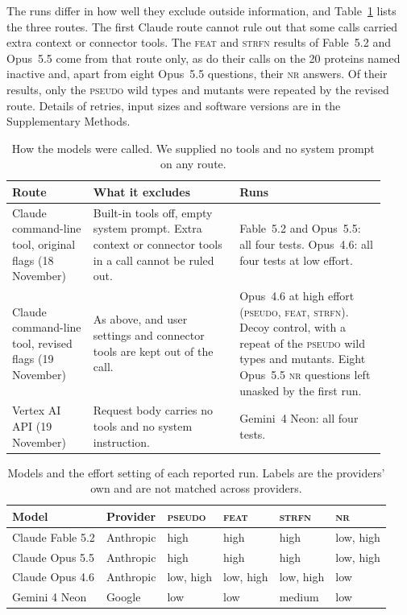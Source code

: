 \documentclass[11pt]{article}
\newcommand{\tnr}{\textmd{\textsc{nr}}}\newcommand{\tfeat}{\textmd{\textsc{feat}}}
\newcommand{\tpseudo}{\textmd{\textsc{pseudo}}}\newcommand{\tstrfn}{\textmd{\textsc{strfn}}}
\begin{document}
The runs differ in how well they exclude outside information, and Table~\ref{tab:routes} lists the
three routes. The first Claude route cannot rule out that some calls carried extra context or connector
tools. The \tfeat{} and \tstrfn{} results of Fable~5.2 and Opus~5.5 come from that route only, as do
their calls on the 20 proteins named inactive and, apart from eight Opus~5.5 questions, their \tnr{}
answers. Of their results, only the \tpseudo{} wild types and mutants were repeated by the revised route. Details
of retries, input sizes and software versions are in the Supplementary Methods.

\begin{table}[ht]
\centering\small
\caption{How the models were called. We supplied no tools and no system prompt on any route.}
\label{tab:routes}
\begin{tabular}{p{0.2\linewidth}p{0.36\linewidth}p{0.36\linewidth}}
\toprule
Route & What it excludes & Runs \\
\midrule
Claude command-line tool, original flags (18 November) & Built-in tools off, empty system prompt. Extra context or connector tools in a call cannot be ruled out. & Fable~5.2 and Opus~5.5: all four tests. Opus~4.6: all four tests at low effort. \\
\addlinespace
Claude command-line tool, revised flags (19 November) & As above, and user settings and connector tools are kept out of the call. & Opus~4.6 at high effort (\tpseudo, \tfeat, \tstrfn). Decoy control, with a repeat of the \tpseudo{} wild types and mutants. Eight Opus~5.5 \tnr{} questions left unasked by the first run. \\
\addlinespace
Vertex AI API (19 November) & Request body carries no tools and no system instruction. & Gemini~4 Neon: all four tests. \\
\bottomrule
\end{tabular}
\end{table}

\begin{table}[ht]
\centering\small
\caption{Models and the effort setting of each reported run. Labels are the providers' own and are not matched across providers.}
\label{tab:models}
\begin{tabular}{llllll}
\toprule
Model & Provider & \tpseudo & \tfeat & \tstrfn & \tnr \\
\midrule
Claude Fable 5.2 & Anthropic & high & high & high & low, high \\
Claude Opus 5.5 & Anthropic & high & high & high & low, high \\
Claude Opus 4.6 & Anthropic & low, high & low, high & low, high & low \\
Gemini 4 Neon & Google & low & low & medium & low \\
\bottomrule
\end{tabular}
\end{table}
\end{document}
